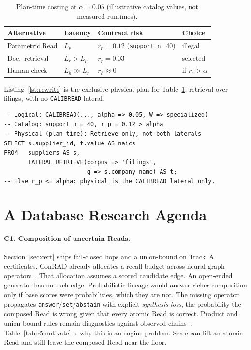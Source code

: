 \documentclass[sigconf, nonacm]{acmart}
\newcommand{\cbras}{\texttt{answer}/\allowbreak\texttt{set}/\allowbreak\texttt{abstain}}
\begin{document}
\begin{table}[t]
\caption{Plan-time costing at $\alpha{=}0.05$ (illustrative catalog values, not measured runtimes).}
\label{tab:opt}
\small
\setlength{\tabcolsep}{3pt}
\begin{tabular}{@{}llll@{}}
\toprule
Alternative & Latency & Contract risk & Choice \\
\midrule
Parametric Read & $L_p$ & $r_p{=}0.12$ (\texttt{support\_n}{=}40) & illegal \\
Doc.\ retrieval & $L_r>L_p$ & $r_r{=}0.03$ & selected \\
Human check & $L_h\gg L_r$ & $r_h\approx 0$ & if $r_r>\alpha$ \\
\bottomrule
\end{tabular}
\end{table}

Listing~\ref{lst:rewrite} is the exclusive physical plan for Table~\ref{tab:opt}: retrieval over filings, with no \texttt{CALIBREAD} lateral.

\begin{lstlisting}[float,caption={Exclusive physical alternative when catalog $r_p>\alpha$ (Table~\ref{tab:opt}).},label={lst:rewrite}]
-- Logical: CALIBREAD(..., alpha => 0.05, W => specialized)
-- Catalog: support_n = 40, r_p = 0.12 > alpha
-- Physical (plan time): Retrieve only, not both laterals
SELECT s.supplier_id, t.value AS naics
FROM   suppliers AS s,
       LATERAL RETRIEVE(corpus => 'filings',
                        q => s.company_name) AS t;
-- Else r_p <= alpha: physical is the CALIBREAD lateral only.
\end{lstlisting}

\section{A Database Research Agenda}

\paragraph{C1. Composition of uncertain Reads.}
Section~\ref{sec:cert} ships fail-closed hops and a union-bound on Track~A certificates. ConRAD already allocates a recall budget across neural graph operators~\cite{horchidan2026conrad}. That allocation assumes a scored candidate edge. An open-ended generator has no such edge. Probabilistic lineage would answer richer composition only if base scores were probabilities, which they are not. The missing operator propagates \cbras{} with explicit \emph{synthesis loss}, the probability the composed Read is wrong given that every atomic Read is correct. Product and union-bound rules remain diagnostics against observed chains~\cite{trivedi2022musique,yang2024socrates}. Table~\ref{tab:r5motivate} is why this is an engine problem. Scale can lift an atomic Read and still leave the composed Read near the floor.
\end{document}
